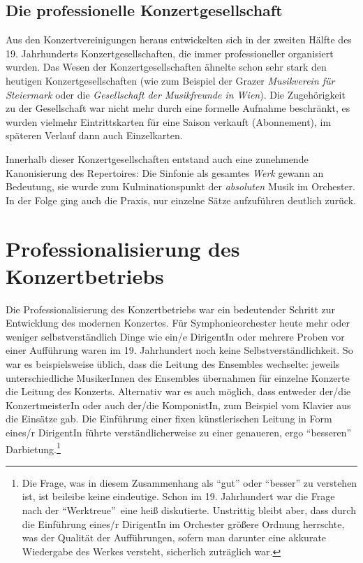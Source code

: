 \documentclass[a4paper, german, oneside]{scrbook}
\begin{document}
\subsection{Die professionelle Konzertgesellschaft}
\label{konzertgesellschaft}
Aus den Konzertvereinigungen heraus entwickelten sich in der zweiten Hälfte des 19. Jahrhunderts Konzertgesellschaften, die immer professioneller organisiert wurden. Das Wesen der Konzertgesellschaften ähnelte schon sehr stark den heutigen Konzertgesellschaften (wie zum Beispiel der Grazer \emph{Musikverein für Steiermark} oder die \emph{Gesellschaft der Musikfreunde in Wien}). Die Zugehörigkeit zu der Gesellschaft war nicht mehr durch eine formelle Aufnahme beschränkt, es wurden vielmehr Eintrittskarten für eine Saison verkauft (Abonnement), im späteren Verlauf dann auch Einzelkarten. \parencite[vgl.][106]{heister_konzert:_1983}

Innerhalb dieser Konzertgesellschaften entstand auch eine zunehmende Kanonisierung des Repertoires: Die Sinfonie als gesamtes \emph{Werk} gewann an Bedeutung, sie wurde zum Kulminationspunkt der \emph{absoluten} Musik im Orchester. In der Folge ging auch die Praxis, nur einzelne Sätze aufzuführen deutlich zurück. \parencite[vgl.][231ff.]{muller_publikum_2014}



\section{Professionalisierung des Konzertbetriebs}
\label{professionalisierung}
Die Professionalisierung des Konzertbetriebs war ein bedeutender Schritt zur Entwicklung des modernen Konzertes. Für Symphonieorchester heute mehr oder weniger selbstverständlich Dinge wie ein/e DirigentIn oder mehrere Proben vor einer Aufführung waren im 19. Jahrhundert noch keine Selbstverständlichkeit. So war es beispielsweise üblich, dass die Leitung des Ensembles wechselte: jeweils unterschiedliche MusikerInnen des Ensembles übernahmen für einzelne Konzerte die Leitung des Konzerts. \parencite[vgl.][68]{weber_music_2004} Alternativ war es auch möglich, dass entweder der/die KonzertmeisterIn oder auch der/die KomponistIn, zum Beispiel vom Klavier aus die Einsätze gab. Die Einführung einer fixen künstlerischen Leitung in Form eines/r DirigentIn führte verständlicherweise zu einer genaueren, ergo \enquote{besseren} Darbietung.\footnote{Die Frage, was in diesem Zusammenhang als \enquote{gut} oder \enquote{besser} zu verstehen ist, ist beileibe keine eindeutige. Schon im 19. Jahrhundert war die Frage nach der \enquote{Werktreue} eine heiß diskutierte. Unstrittig bleibt aber, dass durch die Einführung eines/r DirigentIn im Orchester größere Ordnung herrschte, was der Qualität der Aufführungen, sofern man darunter eine akkurate Wiedergabe des Werkes versteht, sicherlich zuträglich war.}
\end{document}
